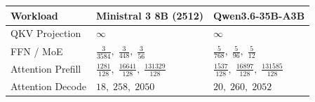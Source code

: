 \begin{tabular}{@{}lll@{}}\toprule
Workload & Ministral 3 8B (2512) & Qwen3.6-35B-A3B\\\midrule
QKV Projection & $\infty$ & $\infty$\\[4pt]
FFN / MoE & $\frac{3}{3584},\;\frac{3}{448},\;\frac{3}{56}$ & $\frac{5}{768},\;\frac{5}{96},\;\frac{5}{12}$\\[4pt]
Attention Prefill & $\frac{1281}{128},\;\frac{16641}{128},\;\frac{131329}{128}$ & $\frac{1537}{128},\;\frac{16897}{128},\;\frac{131585}{128}$\\[4pt]
Attention Decode & $18,\;258,\;2050$ & $20,\;260,\;2052$\\[4pt]
\bottomrule\end{tabular}
